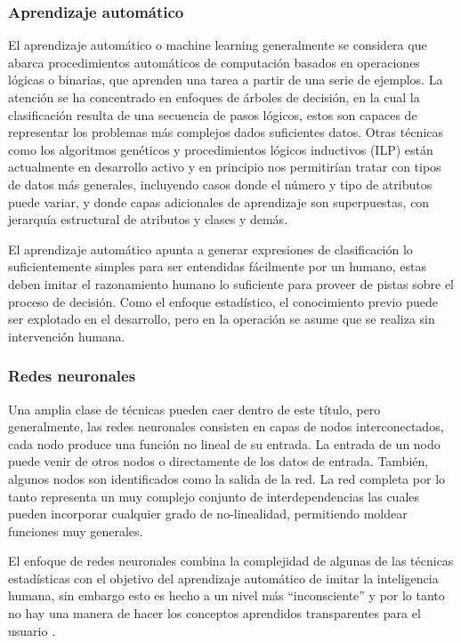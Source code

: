 \subsubsection{Aprendizaje automático}
El aprendizaje automático o machine learning generalmente se considera que abarca procedimientos automáticos de computación basados en operaciones lógicas o binarias, que aprenden una tarea a partir de una serie de ejemplos.
La atención se ha concentrado en enfoques de árboles de decisión, en la cual la clasificación resulta de una secuencia de pasos lógicos, estos son capaces de representar los problemas más complejos dados suficientes datos.
Otras técnicas como los algoritmos genéticos y procedimientos lógicos inductivos (ILP) están actualmente en desarrollo activo y en principio nos permitirían tratar con tipos de datos más generales, incluyendo casos donde el número y tipo de atributos puede variar, y donde capas adicionales de aprendizaje son superpuestas, con jerarquía estructural de atributos y clases y demás. 

El aprendizaje automático apunta a generar expresiones de clasificación lo suficientemente simples para ser entendidas fácilmente por un humano, estas deben imitar el razonamiento humano lo suficiente para proveer de pistas sobre el proceso de decisión. 
Como el enfoque estadístico, el conocimiento previo puede ser explotado en el desarrollo, pero en la operación se asume que se realiza sin intervención humana.

\subsubsection{Redes neuronales}
Una amplia clase de técnicas pueden caer dentro de este título, pero generalmente, las redes neuronales consisten en capas de nodos interconectados, cada nodo produce una función no lineal de su entrada. La entrada de un nodo puede venir de otros nodos o directamente de los datos de entrada. También, algunos nodos son identificados como la salida de la red. La red completa por lo tanto representa un muy complejo conjunto de interdependencias las cuales pueden incorporar cualquier grado de no-linealidad, permitiendo moldear funciones muy generales. 

El enfoque de redes neuronales combina la complejidad de algunas de las técnicas estadísticas con el objetivo del aprendizaje automático de imitar la inteligencia humana, sin embargo esto es hecho a un nivel más ``inconsciente'' y por lo tanto no hay una manera de hacer los conceptos aprendidos transparentes para el usuario \cite{Michie94machinelearning}.

